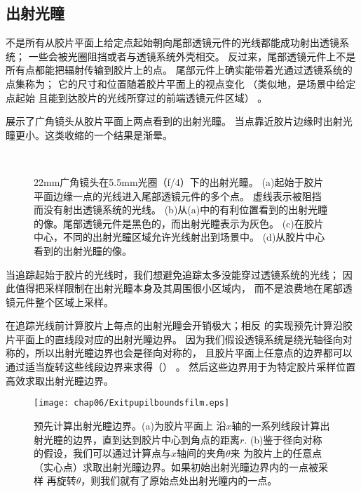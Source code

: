 \subsection{出射光瞳}\label{sub:出射光瞳}
不是所有从胶片平面上给定点起始朝向尾部透镜元件的光线都能成功射出透镜系统；
一些会被光圈阻挡或者与透镜系统外壳相交。
反过来，尾部透镜元件上不是所有点都能把辐射传输到胶片上的点。
尾部元件上确实能带着光通过透镜系统的点集称为；
它的尺寸和位置随着胶片平面上的视点变化
（类似地，是场景中给定点起始
且能到达胶片的光线所穿过的前端透镜元件区域）
。

展示了广角镜头从胶片平面上两点看到的出射光瞳。
当点靠近胶片边缘时出射光瞳更小。这类收缩的一个结果是渐晕。
\begin{figure}[htbp]
    \centering
    \qquad
    \\
    \qquad
    \caption{22mm广角镜头在5.5mm光圈（f/4）下的出射光瞳。
        (a)起始于胶片平面边缘一点的光线进入尾部透镜元件的多个点。
        虚线表示被阻挡而没有射出透镜系统的光线。
        (b)从(a)中的有利位置看到的出射光瞳的像。尾部透镜元件是黑色的，而出射光瞳表示为灰色。
        (c)在胶片中心，不同的出射光瞳区域允许光线射出到场景中。
        (d)从胶片中心看到的出射光瞳的像。}
    \label{fig:6.21}
\end{figure}

当追踪起始于胶片的光线时，我们想避免追踪太多没能穿过透镜系统的光线；
因此值得把采样限制在出射光瞳本身及其周围很小区域内，
而不是浪费地在尾部透镜元件整个区域上采样。

在追踪光线前计算胶片上每点的出射光瞳会开销极大；相反
的实现预先计算沿胶片平面上的直线段对应的出射光瞳边界。
因为我们假设透镜系统是绕光轴径向对称的，所以出射光瞳边界也会是径向对称的，
且胶片平面上任意点的边界都可以通过适当旋转这些线段边界来求得（）
。
然后这些边界用于为特定胶片采样位置高效求取出射光瞳边界。
\begin{figure}[htbp]
    \centering\texttt{[image: chap06/Exitpupilboundsfilm.eps]}
    \caption{预先计算出射光瞳边界。(a)为胶片平面上
        沿$x$轴的一系列线段计算出射光瞳的边界，直到达到胶片中心到角点的距离$r$.
        (b)鉴于径向对称的假设，我们可以通过计算点与$x$轴间的夹角$\theta$来
        为胶片上的任意点（实心点）求取出射光瞳边界。如果初始出射光瞳边界内的一点被采样
        再旋转$\theta$，则我们就有了原始点处出射光瞳内的一点。}
    \label{fig:6.22}
\end{figure}

